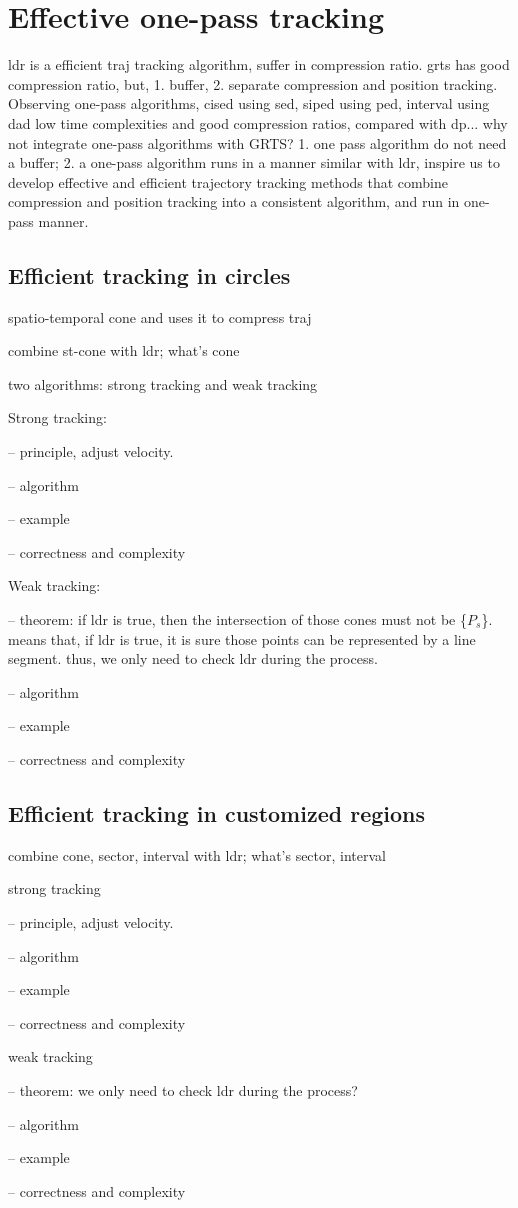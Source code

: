 

\section{Effective one-pass tracking}
\label{sec:traj}
ldr is a efficient traj tracking algorithm, suffer in compression ratio.
grts has good compression ratio, but, 1. buffer, 2. separate compression and position tracking.
Observing one-pass algorithms, cised using sed, siped using ped, interval using dad
low time complexities and good compression ratios, compared with dp...
why not integrate one-pass algorithms with GRTS? 
1. one pass algorithm do not need a buffer; 2. a one-pass algorithm runs in a manner similar with ldr, 
inspire us to develop effective and efficient trajectory tracking methods that combine compression and position tracking into a consistent algorithm, and run in one-pass manner. 

\subsection{Efficient tracking in circles}

spatio-temporal cone and uses it to compress traj

combine st-cone with ldr; what's cone


two algorithms: strong tracking and weak tracking

Strong tracking: 

-- principle, adjust velocity.

-- algorithm

-- example

-- correctness and complexity

Weak tracking:

-- theorem: if ldr is true, then the intersection of those cones must not be \{$P_s$\}.
means that, if ldr is true, it is sure those points can be represented by a line segment.
thus, we only need to check ldr during the process.

-- algorithm

-- example

-- correctness and complexity

\subsection{Efficient tracking in customized regions}

combine cone, sector, interval with ldr; what's sector, interval

strong tracking

-- principle, adjust velocity.

-- algorithm

-- example

-- correctness and complexity

weak tracking

-- theorem: we only need to check ldr during the process?

-- algorithm

-- example

-- correctness and complexity
